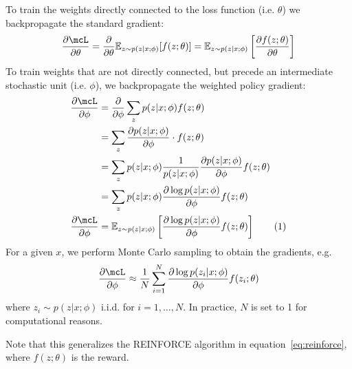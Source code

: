 \documentclass[11pt]{report}
\newcommand\numberthis{\addtocounter{equation}{1}\tag{\theequation}}
\begin{document}
To train the weights directly connected to the loss function (i.e. $\theta$) we backpropagate the standard gradient:
\begin{equation}
\frac{\partial \mcL}{\partial \theta} = \frac{\partial}{\partial \theta} \mathbb{E}_{z \sim p(z | x; \phi)} [ f(z ; \theta) ] =  \mathbb{E}_{z \sim p(z | x; \phi)} \left[ \frac{\partial f(z ; \theta)}{\partial \theta} \right]
\end{equation}
To train weights that are not directly connected, but precede an intermediate stochastic unit (i.e. $\phi$), we backpropagate the weighted policy gradient:
\begin{align*}
\frac{\partial \mcL}{\partial \phi} &= \frac{\partial}{\partial \phi} \sum_z p(z | x; \phi) f(z ; \theta) \\
& = \sum_z \frac{ \partial  p(z | x; \phi) } {\partial \phi} \cdot f(z ; \theta) \\
&= \sum_z p(z | x; \phi) \frac{1}{p(z|x;\phi)}\frac{ \partial  p(z | x; \phi) } {\partial \phi} f(z ; \theta) \\
&= \sum_z p(z | x; \phi) \frac{ \partial  \log p(z | x; \phi) } {\partial \phi} f(z ; \theta) \\
\frac{\partial \mcL}{\partial \phi} &= \mathbb{E}_{z \sim p(z | x; \phi)} \left[ \frac{ \partial  \log p(z | x; \phi) } {\partial \phi} f(z ; \theta) \right] \numberthis
\end{align*}
For a given $x$, we perform Monte Carlo sampling to obtain the gradients, e.g.
\begin{equation}
\frac{\partial \mcL}{\partial \phi} \approx \frac{1}{N} \sum_{i=1}^N \frac{ \partial  \log p(z_i | x; \phi) } {\partial \phi} f(z_i ; \theta)
\end{equation}
where $z_i \sim p(z | x; \phi)$ i.i.d. for $i = 1, \ldots, N$. In practice, $N$ is set to 1 for computational reasons.

Note that this generalizes the REINFORCE algorithm in equation~\ref{eq:reinforce}, where $f(z ; \theta)$ is the reward.
\end{document}
